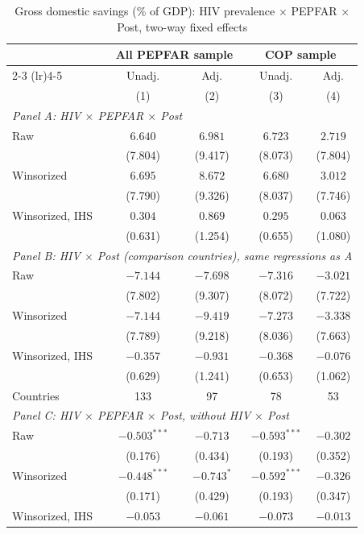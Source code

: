 \begin{table}[htbp]
\centering
\small
\caption{Gross domestic savings (\% of GDP): HIV prevalence $\times$ PEPFAR $\times$ Post, two-way fixed effects}
\label{tab:crown_mech_savings_triple}
\begin{tabular}{lcccc}
\toprule
 & \multicolumn{2}{c}{All PEPFAR sample} & \multicolumn{2}{c}{COP sample} \\
\cmidrule(lr){2-3} \cmidrule(lr){4-5}
 & Unadj. & Adj. & Unadj. & Adj. \\
 & (1) & (2) & (3) & (4) \\
\midrule
\multicolumn{5}{l}{\textit{Panel A: HIV $\times$ PEPFAR $\times$ Post}} \\
Raw & $6.640$ & $6.981$ & $6.723$ & $2.719$ \\
 & (7.804) & (9.417) & (8.073) & (7.804) \\
Winsorized & $6.695$ & $8.672$ & $6.680$ & $3.012$ \\
 & (7.790) & (9.326) & (8.037) & (7.746) \\
Winsorized, IHS & $0.304$ & $0.869$ & $0.295$ & $0.063$ \\
 & (0.631) & (1.254) & (0.655) & (1.080) \\
\midrule
\multicolumn{5}{l}{\textit{Panel B: HIV $\times$ Post (comparison countries), same regressions as A}} \\
Raw & $-7.144$ & $-7.698$ & $-7.316$ & $-3.021$ \\
 & (7.802) & (9.307) & (8.072) & (7.722) \\
Winsorized & $-7.144$ & $-9.419$ & $-7.273$ & $-3.338$ \\
 & (7.789) & (9.218) & (8.036) & (7.663) \\
Winsorized, IHS & $-0.357$ & $-0.931$ & $-0.368$ & $-0.076$ \\
 & (0.629) & (1.241) & (0.653) & (1.062) \\
Countries & 133 & 97 & 78 & 53 \\
\midrule
\multicolumn{5}{l}{\textit{Panel C: HIV $\times$ PEPFAR $\times$ Post, without HIV $\times$ Post}} \\
Raw & $-0.503^{***}$ & $-0.713$ & $-0.593^{***}$ & $-0.302$ \\
 & (0.176) & (0.434) & (0.193) & (0.352) \\
Winsorized & $-0.448^{***}$ & $-0.743^{*}$ & $-0.592^{***}$ & $-0.326$ \\
 & (0.171) & (0.429) & (0.193) & (0.347) \\
Winsorized, IHS & $-0.053$ & $-0.061$ & $-0.073$ & $-0.013$ \\

\end{tabular}
\end{table}
